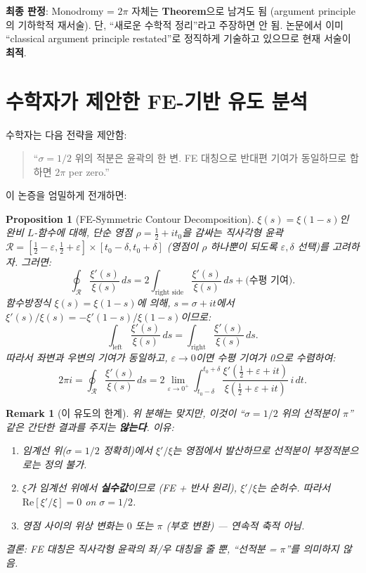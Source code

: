 \documentclass[11pt]{article}
\newtheorem{proposition}[theorem]{Proposition}
\newtheorem{remark}[theorem]{Remark}
\begin{document}
\textbf{최종 판정}: Monodromy = $2\pi$ 자체는 \textbf{Theorem}으로 남겨도 됨
(argument principle의 기하학적 재서술). 단, ``새로운 수학적 정리''라고 주장하면 안 됨.
논문에서 이미 ``classical argument principle restated''로 정직하게 기술하고 있으므로
현재 서술이 \textbf{최적}.

\section{수학자가 제안한 FE-기반 유도 분석}

수학자는 다음 전략을 제안함:
\begin{quote}
  ``$\sigma=1/2$ 위의 적분은 윤곽의 한 변.
  FE 대칭으로 반대편 기여가 동일하므로 합하면 $2\pi$ per zero.''
\end{quote}

이 논증을 엄밀하게 전개하면:

\begin{proposition}[FE-Symmetric Contour Decomposition]
\label{prop:fe_contour}
$\xi(s) = \xi(1-s)$인 완비 $L$-함수에 대해, 단순 영점
$\rho = \tfrac{1}{2} + it_0$을 감싸는 직사각형 윤곽
$\mathcal{R} = [\tfrac{1}{2}-\varepsilon, \tfrac{1}{2}+\varepsilon]
\times [t_0-\delta, t_0+\delta]$ (영점이 $\rho$ 하나뿐이 되도록 $\varepsilon, \delta$ 선택)를
고려하자. 그러면:
\begin{equation}
  \oint_{\mathcal{R}} \frac{\xi'(s)}{\xi(s)}\,ds
  = 2 \int_{\text{right side}} \frac{\xi'(s)}{\xi(s)}\,ds
  + \text{(수평 기여)}.
\end{equation}
함수방정식 $\xi(s) = \xi(1-s)$에 의해, $s = \sigma + it$에서
$\xi'(s)/\xi(s) = -\xi'(1-s)/\xi(1-s)$이므로:
\[
  \int_{\text{left}} \frac{\xi'(s)}{\xi(s)}\,ds
  = \int_{\text{right}} \frac{\xi'(s)}{\xi(s)}\,ds.
\]
따라서 좌변과 우변의 기여가 동일하고, $\varepsilon \to 0$이면 수평 기여가 0으로 수렴하여:
\[
  2\pi i = \oint_{\mathcal{R}} \frac{\xi'(s)}{\xi(s)}\,ds
  = 2 \lim_{\varepsilon \to 0^+}\int_{t_0-\delta}^{t_0+\delta}
  \frac{\xi'(\tfrac{1}{2}+\varepsilon+it)}{\xi(\tfrac{1}{2}+\varepsilon+it)}\,i\,dt.
\]
\end{proposition}

\begin{remark}[이 유도의 한계]
위 분해는 맞지만, 이것이 ``$\sigma=1/2$ 위의 선적분이 $\pi$'' 같은 간단한 결과를
주지는 \textbf{않는다}. 이유:
\begin{enumerate}
  \item 임계선 위($\sigma = 1/2$ 정확히)에서 $\xi'/\xi$는 영점에서 발산하므로
    선적분이 부정적분으로는 정의 불가.
  \item $\xi$가 임계선 위에서 \textbf{실수값}이므로 (FE + 반사 원리),
    $\xi'/\xi$는 순허수. 따라서 $\text{Re}[\xi'/\xi] = 0$ on $\sigma=1/2$.
  \item 영점 사이의 위상 변화는 $0$ 또는 $\pi$ (부호 변환) — 연속적 축적 아님.
\end{enumerate}
결론: FE 대칭은 직사각형 윤곽의 좌/우 대칭을 줄 뿐, ``선적분 = $\pi$''를
의미하지 않음.
\end{remark}
\end{document}
